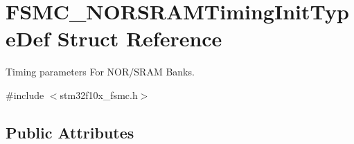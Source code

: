 \hypertarget{struct_f_s_m_c___n_o_r_s_r_a_m_timing_init_type_def}{}\section{F\+S\+M\+C\+\_\+\+N\+O\+R\+S\+R\+A\+M\+Timing\+Init\+Type\+Def Struct Reference}
\label{struct_f_s_m_c___n_o_r_s_r_a_m_timing_init_type_def}


Timing parameters For N\+O\+R/\+S\+R\+AM Banks.  




{\ttfamily \#include $<$stm32f10x\+\_\+fsmc.\+h$>$}

\subsection*{Public Attributes}
